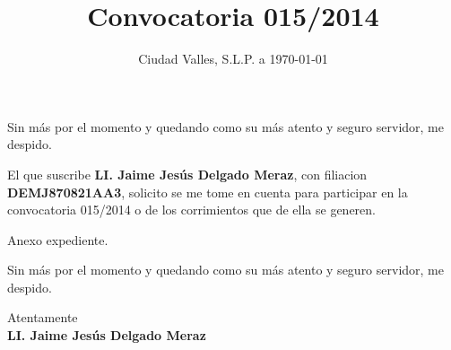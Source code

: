 \documentclass[10pt,letterpaper,sans]{moderncv}
\title{Convocatoria 015/2014}
\begin{document}
\date{Ciudad Valles, S.L.P. a \today}
\opening{}
\closing{Sin más por el momento y quedando como su más atento y seguro servidor, me despido.}
\makelettertitle

El que suscribe \textbf{LI. Jaime Jesús Delgado Meraz}, con filiacion \textbf{DEMJ870821AA3}, solicito se me tome en cuenta para participar en la convocatoria 015/2014 o de los corrimientos que de ella se generen.

Anexo expediente.

Sin más por el momento y quedando como su más atento y seguro servidor, me despido.

\vspace{0.5cm}Atentamente\vspace{1.5cm}\\\textbf{LI. Jaime Jesús Delgado Meraz}

\end{document}
